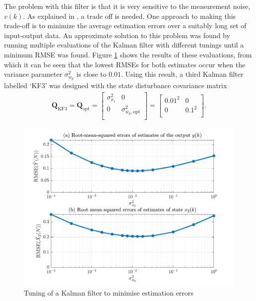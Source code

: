 The problem with this filter is that it is very sensitive to the measurement noise, $v(k)$. As explained in \cite{robertson_detection_1995}, a trade off is needed. One approach to making this trade-off is to minimize the average estimation errors over a suitably long set of input-output data. An approximate solution to this problem was found by running multiple evaluations of the Kalman filter with different tunings until a minimum RMSE was found. Figure \ref{fig:sim-sys-siso-KF3-tuning} shows the results of these evaluations, from which it can be seen that the lowest RMSEs for both estimates occur when the variance parameter $\sigma_{w_p}^2$ is close to $0.01$. Using this result, a third Kalman filter labelled `KF3' was designed with the state disturbance covariance matrix 
\begin{equation} \label{eq:sim-sys-siso-KF3-Q}
	\begin{aligned}
		\mathbf{Q}_{\text{KF3}}=\mathbf{Q}_{\text{opt}}=\begin{bmatrix}
			\sigma_{x_1}^2 & 0 \\
			0 & \sigma_{w_p,\text{opt}}^2 \\
		\end{bmatrix}=\begin{bmatrix}
			0.01^2 & 0 \\
			0 & 0.1^2 \\
		\end{bmatrix}.
	\end{aligned}
\end{equation}

\begin{figure}[htp]
	\centering
	\includegraphics[width=14cm]{images/rod_obs_sim1_plot_KF3_tuning.pdf}
	\caption{Tuning of a Kalman filter to minimise estimation errors}
	\label{fig:sim-sys-siso-KF3-tuning}
\end{figure}

